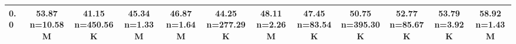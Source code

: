 \begin{table}
\begin{tabular}{lccccccccccc}
0.0 & \makecell{53.87 \\ \scriptsize n=10.58M} & \makecell{41.15 \\ \scriptsize n=450.56K} & \makecell{45.34 \\ \scriptsize n=1.33M} & \makecell{46.87 \\ \scriptsize n=1.64M} & \makecell{44.25 \\ \scriptsize n=277.29K} & \makecell{48.11 \\ \scriptsize n=2.26M} & \makecell{47.45 \\ \scriptsize n=83.54K} & \makecell{50.75 \\ \scriptsize n=395.30K} & \makecell{52.77 \\ \scriptsize n=85.67K} & \makecell{53.79 \\ \scriptsize n=3.92K} & \makecell{58.92 \\ \scriptsize n=1.43M} \\
            \bottomrule
            \end{tabular}
            \label{tab:si-disruption-matrix-4}
            \end{table}